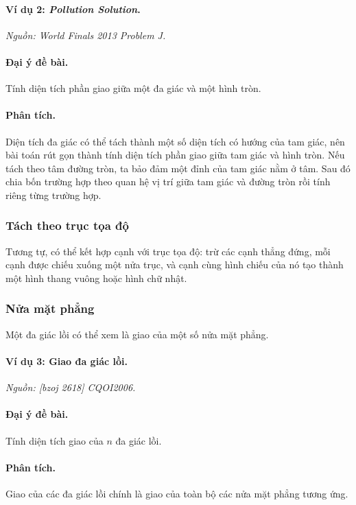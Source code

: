 \documentclass[11pt]{article}
\begin{document}
\paragraph{Ví dụ 2: \emph{Pollution Solution}.}
\emph{Nguồn: World Finals 2013 Problem J.}

\paragraph{Đại ý đề bài.}
Tính diện tích phần giao giữa một đa giác và một hình tròn.

\paragraph{Phân tích.}
Diện tích đa giác có thể tách thành một số diện tích có hướng của tam giác, nên
bài toán rút gọn thành tính diện tích phần giao giữa tam giác và hình tròn. Nếu
tách theo tâm đường tròn, ta bảo đảm một đỉnh của tam giác nằm ở tâm. Sau đó
chia bốn trường hợp theo quan hệ vị trí giữa tam giác và đường tròn rồi tính
riêng từng trường hợp.

\subsubsection{Tách theo trục tọa độ}

Tương tự, có thể kết hợp cạnh với trục tọa độ: trừ các cạnh thẳng đứng, mỗi
cạnh được chiếu xuống một nửa trục, và cạnh cùng hình chiếu của nó tạo thành
một hình thang vuông hoặc hình chữ nhật.

\subsubsection{Nửa mặt phẳng}

Một đa giác lồi có thể xem là giao của một số nửa mặt phẳng.

\paragraph{Ví dụ 3: Giao đa giác lồi.}
\emph{Nguồn: [bzoj 2618] CQOI2006.}

\paragraph{Đại ý đề bài.}
Tính diện tích giao của \(n\) đa giác lồi.

\paragraph{Phân tích.}
Giao của các đa giác lồi chính là giao của toàn bộ các nửa mặt phẳng tương ứng.
\end{document}
